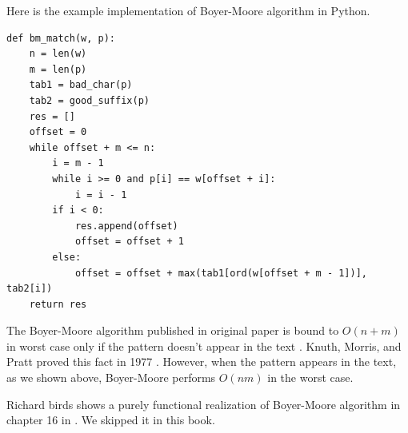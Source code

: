 \documentclass[UTF8]{article}
\begin{document}
Here is the example implementation of Boyer-Moore algorithm in Python.

\lstset{language=Python}
\begin{lstlisting}
def bm_match(w, p):
    n = len(w)
    m = len(p)
    tab1 = bad_char(p)
    tab2 = good_suffix(p)
    res = []
    offset = 0
    while offset + m <= n:
        i = m - 1
        while i >= 0 and p[i] == w[offset + i]:
            i = i - 1
        if i < 0:
            res.append(offset)
            offset = offset + 1
        else:
            offset = offset + max(tab1[ord(w[offset + m - 1])], tab2[i])
    return res
\end{lstlisting}

The Boyer-Moore algorithm published in original paper is bound to $O(n+m)$ in worst case only
if the pattern doesn't appear in the text \cite{boyer-moore}. Knuth, Morris, and Pratt proved
this fact in 1977 \cite{wiki-boyer-moore}. However, when the pattern appears in the text, as
we shown above, Boyer-Moore performs $O(nm)$ in the worst case.

Richard birds shows a purely functional realization of Boyer-Moore algorithm in chapter 16 in
\cite{fp-pearls}. We skipped it in this book.
\end{document}
